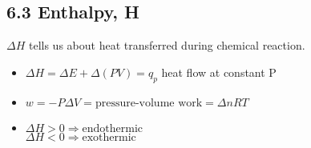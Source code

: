 \subsection{6.3 Enthalpy, H}
    \vspace*{0.2em}
    $\Delta H$ tells us about heat transferred during chemical reaction.
    \begin{itemize}
        \itemsep0em
        \item $\Delta H = \Delta E + \Delta(PV) = q_p$ heat flow at constant P
        \item $w = -P \Delta V = \text{pressure-volume work} = \Delta n R T$
        \item $\Delta H > 0 \Rightarrow \text{endothermic}$\\
              $\Delta H < 0 \Rightarrow \text{exothermic}$
    \end{itemize}
